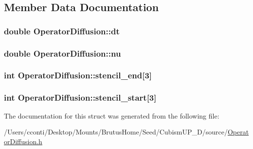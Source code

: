 \subsection{Member Data Documentation}
\hypertarget{struct_operator_diffusion_a8255ce1ebd90d30c4e4ec015280ae6ad}{}
\subsubsection[{dt}]{\setlength{\rightskip}{0pt plus 5cm}double Operator\+Diffusion\+::dt}\label{struct_operator_diffusion_a8255ce1ebd90d30c4e4ec015280ae6ad}
\hypertarget{struct_operator_diffusion_a332291d966d2088dc6f9183751975a3a}{}
\subsubsection[{nu}]{\setlength{\rightskip}{0pt plus 5cm}double Operator\+Diffusion\+::nu}\label{struct_operator_diffusion_a332291d966d2088dc6f9183751975a3a}
\hypertarget{struct_operator_diffusion_a42d733e46348f1fea002dfaa48913042}{}
\subsubsection[{stencil\+\_\+end}]{\setlength{\rightskip}{0pt plus 5cm}int Operator\+Diffusion\+::stencil\+\_\+end\mbox{[}3\mbox{]}}\label{struct_operator_diffusion_a42d733e46348f1fea002dfaa48913042}
\hypertarget{struct_operator_diffusion_a023c363d73e84e0a06be766a0aad85c6}{}
\subsubsection[{stencil\+\_\+start}]{\setlength{\rightskip}{0pt plus 5cm}int Operator\+Diffusion\+::stencil\+\_\+start\mbox{[}3\mbox{]}}\label{struct_operator_diffusion_a023c363d73e84e0a06be766a0aad85c6}


The documentation for this struct was generated from the following file\+:\begin{DoxyCompactItemize}
\item 
/\+Users/cconti/\+Desktop/\+Mounts/\+Brutus\+Home/\+Seed/\+Cubism\+U\+P\+\_\+D/source/\hyperlink{_operator_diffusion_8h}{Operator\+Diffusion.\+h}\end{DoxyCompactItemize}
